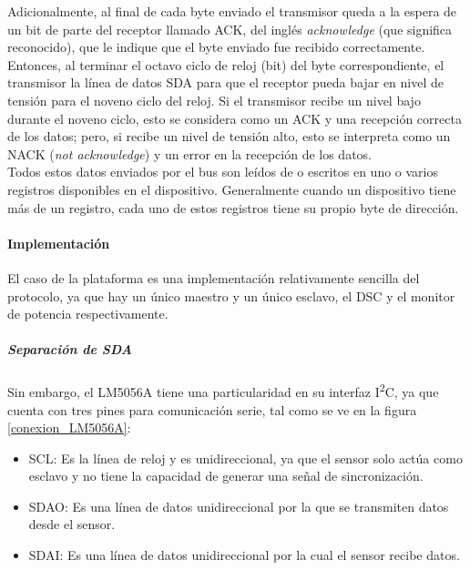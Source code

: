 Adicionalmente, al final de cada byte enviado el transmisor queda a la espera de un bit de parte del receptor llamado ACK, del inglés \textit{acknowledge} (que significa reconocido), que le indique que el byte enviado fue recibido correctamente. Entonces, al terminar el octavo ciclo de reloj (bit) del byte correspondiente, el transmisor  la línea de datos SDA para que el receptor pueda bajar en nivel de tensión para el noveno ciclo del reloj. Si el transmisor recibe un nivel bajo durante el noveno ciclo, esto se considera como un ACK y una recepción correcta de los datos; pero, si recibe un nivel de tensión alto, esto se interpreta como un NACK (\textit{not acknowledge}) y un error en la recepción de los datos.\\

Todos estos datos enviados por el bus son leídos de o escritos en uno o varios registros disponibles en el dispositivo. Generalmente cuando un dispositivo tiene más de un registro, cada uno de estos registros tiene su propio byte de dirección.\\

\paragraph{Implementación}

El caso de la plataforma es una implementación relativamente sencilla del protocolo, ya que hay un único maestro y un único esclavo, el DSC y el monitor de potencia respectivamente.\\

\subparagraph{Separación de SDA}

Sin embargo, el LM5056A tiene una particularidad en su interfaz I\textsuperscript{2}C, ya que cuenta con tres pines para comunicación serie, tal como se ve en la figura \ref{conexion_LM5056A}:

\begin{itemize}
    \item {\Medium SCL:} Es la línea de reloj y es unidireccional, ya que el sensor solo actúa como esclavo y no tiene la capacidad de generar una señal de sincronización.
    \item {\Medium SDAO:} Es una línea de datos unidireccional por la que se transmiten datos desde el sensor.
    \item {\Medium SDAI:} Es una línea de datos unidireccional por la cual el sensor recibe datos.
\end{itemize}


